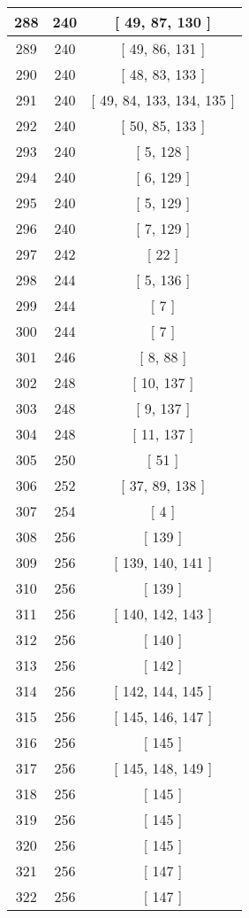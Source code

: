 \begin{center}
\begin{longtable}[H]{|| c c c ||}
\hline
288 & 240 & [ 49, 87, 130 ] \\ 
\hline
289 & 240 & [ 49, 86, 131 ] \\ 
\hline
290 & 240 & [ 48, 83, 133 ] \\ 
\hline
291 & 240 & [ 49, 84, 133, 134, 135 ] \\ 
\hline
292 & 240 & [ 50, 85, 133 ] \\ 
\hline
293 & 240 & [ 5, 128 ] \\ 
\hline
294 & 240 & [ 6, 129 ] \\ 
\hline
295 & 240 & [ 5, 129 ] \\ 
\hline
296 & 240 & [ 7, 129 ] \\ 
\hline
297 & 242 & [ 22 ] \\ 
\hline
298 & 244 & [ 5, 136 ] \\ 
\hline
299 & 244 & [ 7 ] \\ 
\hline
300 & 244 & [ 7 ] \\ 
\hline
301 & 246 & [ 8, 88 ] \\ 
\hline
302 & 248 & [ 10, 137 ] \\ 
\hline
303 & 248 & [ 9, 137 ] \\ 
\hline
304 & 248 & [ 11, 137 ] \\ 
\hline
305 & 250 & [ 51 ] \\ 
\hline
306 & 252 & [ 37, 89, 138 ] \\ 
\hline
307 & 254 & [ 4 ] \\ 
\hline
308 & 256 & [ 139 ] \\ 
\hline
309 & 256 & [ 139, 140, 141 ] \\ 
\hline
310 & 256 & [ 139 ] \\ 
\hline
311 & 256 & [ 140, 142, 143 ] \\ 
\hline
312 & 256 & [ 140 ] \\ 
\hline
313 & 256 & [ 142 ] \\ 
\hline
314 & 256 & [ 142, 144, 145 ] \\ 
\hline
315 & 256 & [ 145, 146, 147 ] \\ 
\hline
316 & 256 & [ 145 ] \\ 
\hline
317 & 256 & [ 145, 148, 149 ] \\ 
\hline
318 & 256 & [ 145 ] \\ 
\hline
319 & 256 & [ 145 ] \\ 
\hline
320 & 256 & [ 145 ] \\ 
\hline
321 & 256 & [ 147 ] \\ 
\hline
322 & 256 & [ 147 ] \\ 

\end{longtable}
\end{center}
